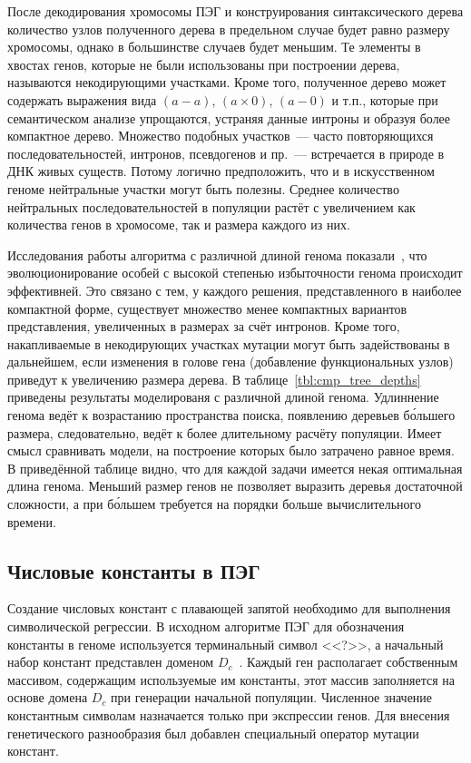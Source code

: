 После декодирования хромосомы ПЭГ и конструирования синтаксического дерева количество узлов полученного дерева в предельном случае будет равно размеру хромосомы, однако в большинстве случаев будет меньшим. Те элементы в хвостах генов, которые не были использованы при построении дерева, называются некодирующими участками. Кроме того, полученное дерево может содержать выражения вида $(a - a)$, $(a \times 0)$, $(a - 0)$ и т.п., которые при семантическом анализе упрощаются, устраняя данные интроны и образуя более компактное дерево. Множество подобных участков~--- часто повторяющихся последовательностей, интронов, псевдогенов и пр.~--- встречается в природе в ДНК живых существ. Потому логично предположить, что и в искусственном геноме нейтральные участки могут быть полезны. Среднее количество нейтральных последовательностей в популяции растёт с увеличением как количества генов в хромосоме, так и размера каждого из них.

Исследования работы алгоритма с различной длиной генома показали~\cite{journals/advcs/Ferreira02}, что эволюционирование особей с высокой степенью избыточности генома происходит эффективней. Это связано с тем, у каждого решения, представленного в наиболее компактной форме, существует множество менее компактных вариантов представления, увеличенных в размерах за счёт интронов. Кроме того, накапливаемые в некодирующих участках мутации могут быть задействованы в дальнейшем, если изменения в голове гена (добавление функциональных узлов) приведут к увеличению размера дерева. В таблице~\ref{tbl:cmp_tree_depths} приведены результаты моделированя с различной длиной генома. Удлиннение генома ведёт к возрастанию пространства поиска, появлению деревьев б\'{о}льшего размера, следовательно, ведёт к более длительному расчёту популяции. Имеет смысл сравнивать модели, на построение которых было затрачено равное время. В приведённой таблице видно, что для каждой задачи имеется некая оптимальная длина генома. Меньший размер генов не позволяет выразить деревья достаточной сложности, а при б\'{о}льшем требуется на порядки больше вычислительного времени.


\subsection{Числовые константы в ПЭГ}

Создание числовых констант с плавающей запятой необходимо для выполнения символической регрессии. В исходном алгоритме ПЭГ для обозначения константы в геноме используется терминальный символ <<?>>, а начальный набор констант представлен доменом $D_c$~\cite{ferreira:2002:WSC}. Каждый ген располагает собственным массивом, содержащим используемые им константы, этот массив заполняется на основе домена $D_c$ при генерации начальной популяции. Численное значение константным символам назначается только при экспрессии генов. Для внесения генетического разнообразия был добавлен специальный оператор мутации констант.

